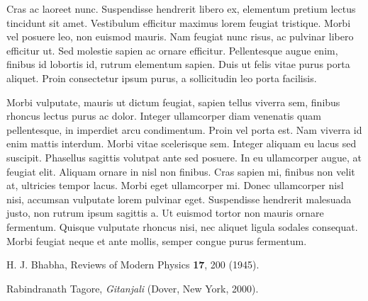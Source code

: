 \documentclass[]{ICCQS}%
\begin{document}

Cras ac laoreet nunc. Suspendisse hendrerit libero ex, elementum pretium lectus tincidunt sit amet. Vestibulum efficitur maximus lorem feugiat tristique. Morbi vel posuere leo, non euismod mauris. Nam feugiat nunc risus, ac pulvinar libero efficitur ut. Sed molestie sapien ac ornare efficitur. Pellentesque augue enim, finibus id lobortis id, rutrum elementum sapien. Duis ut felis vitae purus porta aliquet. Proin consectetur ipsum purus, a sollicitudin leo porta facilisis.

Morbi vulputate, mauris ut dictum feugiat, sapien tellus viverra sem, finibus rhoncus lectus purus ac dolor. Integer ullamcorper diam venenatis quam pellentesque, in imperdiet arcu condimentum. Proin vel porta est. Nam viverra id enim mattis interdum. Morbi vitae scelerisque sem. Integer aliquam eu lacus sed suscipit. Phasellus sagittis volutpat ante sed posuere. In eu ullamcorper augue, at feugiat elit. Aliquam ornare in nisl non finibus. Cras sapien mi, finibus non velit at, ultricies tempor lacus. Morbi eget ullamcorper mi. Donec ullamcorper nisl nisi, accumsan vulputate lorem pulvinar eget. Suspendisse hendrerit malesuada justo, non rutrum ipsum sagittis a. Ut euismod tortor non mauris ornare fermentum. Quisque vulputate rhoncus nisi, nec aliquet ligula sodales consequat. Morbi feugiat neque et ante mollis, semper congue purus fermentum.



\begin{thebibliography}{9}

 H. J. Bhabha, Reviews of Modern Physics {\bf 17}, 200 (1945).

 Rabindranath Tagore, {\em Gitanjali} (Dover, New York, 2000).

\end{thebibliography}
\end{document}
